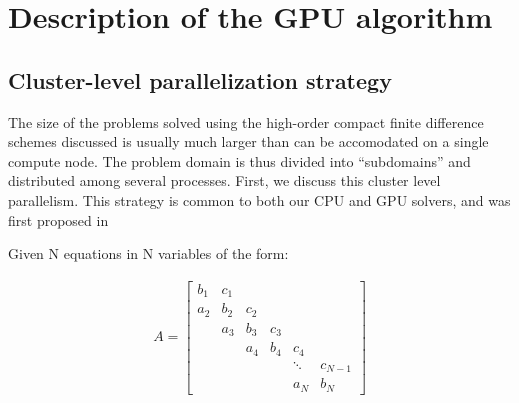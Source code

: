 \documentclass{article}
\begin{document}

\section{Description of the GPU algorithm} \label{sec:gpu-algorithm}

    \subsection{Cluster-level parallelization strategy}

    The size of the problems solved using the high-order compact finite
    difference schemes discussed is usually much larger than can be accomodated
    on a single compute node.
    The problem domain is thus divided into ``subdomains'' and distributed among
    several processes.
    First, we discuss this cluster level parallelism.
    This strategy is common to both our CPU and GPU solvers,
    and was first proposed in \cite{mattor1995algorithm}

    Given N equations in N variables of the form:

    \begin{align}
    & A =
     \begin{bmatrix}
         b_1 & c_1 \\
         a_2 & b_2 & c_2 \\
             & a_3 & b_3 & c_3 \\
             &     & a_4 & b_4 & c_4 \\
             &     &     &     &  \ddots & c_{N-1}\\
             &     &     &     &     a_N  & b_N
      \end{bmatrix}&
    \end{align}
\end{document}
